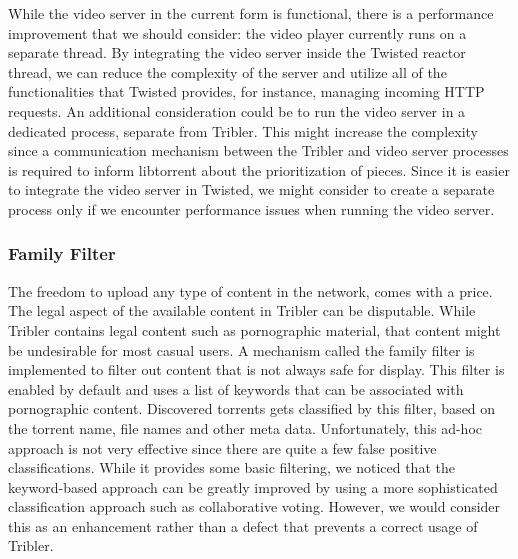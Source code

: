 \noindent While the video server in the current form is functional, there is a performance improvement that we should consider: the video player currently runs on a separate thread. By integrating the video server inside the Twisted reactor thread, we can reduce the complexity of the server and utilize all of the functionalities that Twisted provides, for instance, managing incoming HTTP requests. An additional consideration could be to run the video server in a dedicated process, separate from Tribler. This might increase the complexity since a communication mechanism between the Tribler and video server processes is required to inform libtorrent about the prioritization of pieces. Since it is easier to integrate the video server in Twisted, we might consider to create a separate process only if we encounter performance issues when running the video server.

\subsubsection{\textbf{Family Filter}}
The freedom to upload any type of content in the network, comes with a price. The legal aspect of the available content in Tribler can be disputable. While Tribler  contains legal content such as pornographic material, that content might be undesirable for most casual users. A mechanism called the family filter is  implemented to filter out content that is not always safe for display. This filter is enabled by default and uses a list of keywords that can be associated with pornographic content. Discovered torrents gets classified by this filter, based on the torrent name, file names and other meta data. Unfortunately, this ad-hoc approach is not very effective since there are quite a few false positive classifications. While it provides some basic filtering, we noticed that the keyword-based approach can be greatly improved by using a more sophisticated classification approach such as collaborative voting. However, we would consider this as an enhancement rather than a defect that prevents a correct usage of Tribler.

